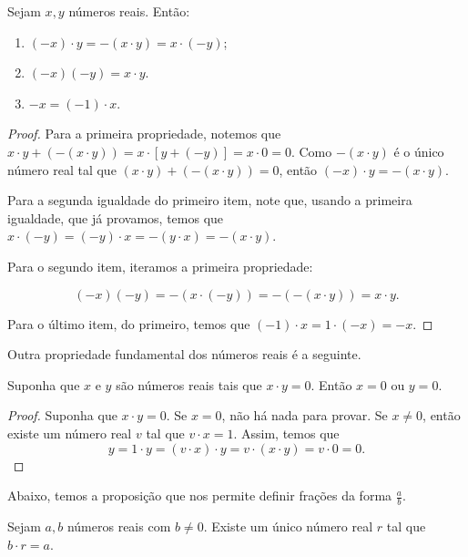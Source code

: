\begin{proposition}
    Sejam $x, y$ números reais.
    Então:
    \begin{enumerate}[label=(\alph*)]
        \item $(-x)\cdot y = -(x\cdot y)=x\cdot (-y)$;
        \item $(-x)(-y)=x\cdot y$.
        \item $-x = (-1)\cdot x$.
    \end{enumerate}
\end{proposition}
\begin{proof}
    Para a primeira propriedade, notemos que $x\cdot y + (-(x\cdot y))=x\cdot[y+(-y)]=x\cdot 0=0$.
    Como $-(x\cdot y)$ é o único número real tal que $(x\cdot y) + (-(x\cdot y))=0$, então $(-x)\cdot y = -(x\cdot y)$.

    Para a segunda igualdade do primeiro item, note que, usando a primeira igualdade, que já provamos, temos que $x\cdot(-y)=(-y)\cdot x=-(y\cdot x)=-(x\cdot y)$.

    Para o segundo item, iteramos a primeira propriedade:

    \[
    (-x)(-y) = -(x\cdot(-y)) = -(-(x\cdot y)) = x\cdot y.
    \]

    Para o último item, do primeiro, temos que $(-1)\cdot x = 1\cdot (-x) = -x$.
\end{proof}

Outra propriedade fundamental dos números reais é a seguinte.
\begin{definition}
    Suponha que $x$ e $y$ são números reais tais que $x\cdot y=0$.
    Então $x=0$ ou $y=0$.
\end{definition}
\begin{proof}
    Suponha que $x\cdot y=0$.
    Se $x=0$, não há nada para provar.
    Se $x\neq 0$, então existe um número real $v$ tal que $v\cdot x=1$.
    Assim, temos que
    \[
    y=1\cdot y=(v\cdot x)\cdot y=v\cdot (x\cdot y)=v\cdot 0=0.
    \]
\end{proof}
Abaixo, temos a proposição que nos permite definir frações da forma $\frac{a}{b}$.

\begin{proposition}
    Sejam $a, b$ números reais com $b\neq 0$.
    Existe um único número real $r$ tal que $b\cdot r=a$.
\end{proposition}

